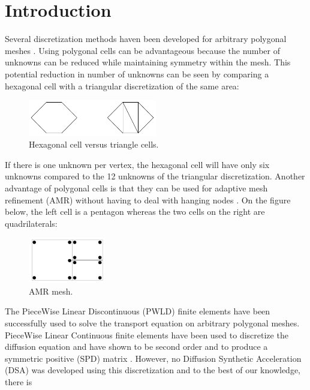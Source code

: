 \section{Introduction}
Several discretization methods haven been developed for arbitrary polygonal
meshes \cite{pwld_2d,pwld_3d,pwl_diffusion,palmer_ane,palmer_proc,palmer_fe,
wachspress,cell_centered_diff,mimetic}.  Using polygonal
cells can be advantageous because the number of unknowns can be reduced while
maintaining symmetry within the mesh. This potential reduction in 
number of unknowns can be seen by comparing a hexagonal cell with a triangular
discretization of the same area:
\begin{figure}[H]
\centering
\includegraphics[width=0.5\textwidth]{hex_tri_cells}
\caption{Hexagonal cell versus triangle cells.}
\end{figure}
If there is one unknown per vertex, the hexagonal cell will have only six
unknowns compared to the 12 unknowns of the triangular discretization. Another 
advantage of polygonal cells is that they can be used for adaptive mesh refinement 
(AMR) \cite{amr_rad,amr_block,amr_unstruc} without having to
deal with hanging nodes \cite{arbitrary_hanging_nodes,dealII_hanging_nodes,
locally_hanging_nodes}. On the figure below, the left cell is a pentagon whereas 
the two cells on the right are quadrilaterals:
\begin{figure}[H]
\centering
\includegraphics[width=0.3\textwidth]{amr}
\caption{AMR mesh.}
\end{figure}
The PieceWise Linear Discontinuous (PWLD) finite elements \cite{pwld_2d,pwld_3d} 
have been successfully used to solve the transport equation on arbitrary
polygonal meshes. PieceWise Linear Continuous finite elements have been used to 
discretize the diffusion equation and have shown to be second order and to
produce a symmetric positive (SPD) matrix \cite{pwl_diffusion}. However, no 
Diffusion Synthetic Acceleration (DSA) \cite{dsa_ref,larsen_dsa,consistent_p1} 
was developed using this discretization and to the best of our knowledge, there is 
